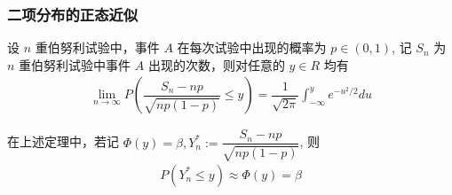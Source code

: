 



\begin{frame}
	\frametitle{二项分布的正态近似}
	\begin{thm} 设 $n$ 重伯努利试验中，事件 $A$ 在每次试验中出现的概率为 $p\in (0,1)$, 记 $S_n$ 为 $n$ 重伯努利试验中事件 $A$ 出现的次数，则对任意的 $y\in R$ 均有
		\begin{eqnarray*}
			\lim_{n\rightarrow\infty}P(\dfrac{S_n-np}{\sqrt{np(1-p)}}\le y)=\dfrac{1}{\sqrt{2\pi}}\int_{-\infty}^ye^{-u^2/2}du
		\end{eqnarray*}

	\end{thm}
	\pause 在上述定理中，若记 $\Phi (y)=\beta, Y_n^*:=\dfrac{S_n-np}{\sqrt{np (1-p)}}$, 则
	\begin{eqnarray*}
		P(Y_n^*\le y)\approx \Phi(y)=\beta
	\end{eqnarray*}


\end{frame}

